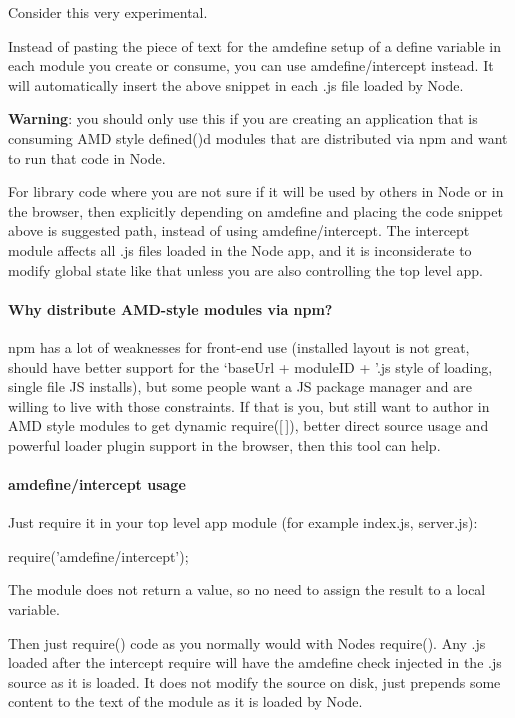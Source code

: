 Consider this very experimental.

Instead of pasting the piece of text for the amdefine setup of a {\ttfamily define} variable in each module you create or consume, you can use {\ttfamily amdefine/intercept} instead. It will automatically insert the above snippet in each .js file loaded by Node.

{\bfseries Warning}\+: you should only use this if you are creating an application that is consuming A\+MD style defined()\textquotesingle{}d modules that are distributed via npm and want to run that code in Node.

For library code where you are not sure if it will be used by others in Node or in the browser, then explicitly depending on amdefine and placing the code snippet above is suggested path, instead of using {\ttfamily amdefine/intercept}. The intercept module affects all .js files loaded in the Node app, and it is inconsiderate to modify global state like that unless you are also controlling the top level app.

\paragraph*{Why distribute A\+M\+D-\/style modules via npm?}

npm has a lot of weaknesses for front-\/end use (installed layout is not great, should have better support for the `base\+Url + module\+ID + '.js\textquotesingle{} style of loading, single file JS installs), but some people want a JS package manager and are willing to live with those constraints. If that is you, but still want to author in A\+MD style modules to get dynamic require(\mbox{[}$\,$\mbox{]}), better direct source usage and powerful loader plugin support in the browser, then this tool can help.

\paragraph*{amdefine/intercept usage}

Just require it in your top level app module (for example index.\+js, server.\+js)\+:


\begin{DoxyCode}
require('amdefine/intercept');
\end{DoxyCode}


The module does not return a value, so no need to assign the result to a local variable.

Then just require() code as you normally would with Node\textquotesingle{}s require(). Any .js loaded after the intercept require will have the amdefine check injected in the .js source as it is loaded. It does not modify the source on disk, just prepends some content to the text of the module as it is loaded by Node.

